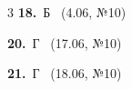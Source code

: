 \documentclass[12pt]{article}
\begin{document}
\ifshowsolutions
{}
\begin{multicols}{3}\noindent
\noindent\textbf{18.}~Б \ {\scriptsize\color{gray}(4.06, №10)}\par
\noindent\textbf{20.}~Г \ {\scriptsize\color{gray}(17.06, №10)}\par
\noindent\textbf{21.}~Г \ {\scriptsize\color{gray}(18.06, №10)}\par
\end{multicols}
\fi

\endgroup
\end{document}
